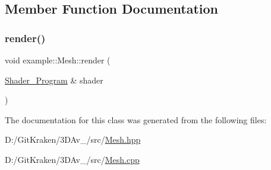 \subsection{Member Function Documentation}
\mbox{\label{classexample_1_1_mesh_ac3296f2f3fcca99f6282a601a5535678}} 
\subsubsection{\texorpdfstring{render()}{render()}}
{\footnotesize\ttfamily void example\+::\+Mesh\+::render (\begin{DoxyParamCaption}\item[{\mbox{\hyperlink{classexample_1_1_shader___program}{Shader\+\_\+\+Program}} \&}]{shader }\end{DoxyParamCaption})}



The documentation for this class was generated from the following files\+:\begin{DoxyCompactItemize}
\item 
D\+:/\+Git\+Kraken/3\+D\+Av\+\_/src/\mbox{\hyperlink{_mesh_8hpp}{Mesh.\+hpp}}\item 
D\+:/\+Git\+Kraken/3\+D\+Av\+\_/src/\mbox{\hyperlink{_mesh_8cpp}{Mesh.\+cpp}}\end{DoxyCompactItemize}
